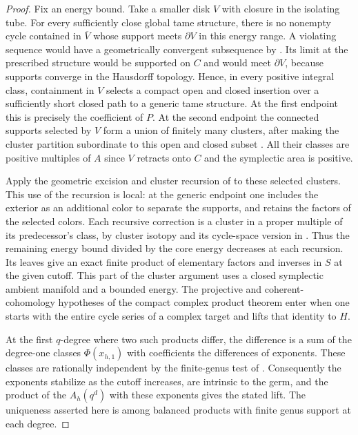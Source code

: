 \begin{proof}
Fix an energy bound. Take a smaller disk $V$ with closure in the
isolating tube. For every sufficiently close global tame structure,
there is no nonempty cycle contained in $\overline V$ whose support
meets $\partial V$ in this energy range. A violating sequence would
have a geometrically convergent subsequence by
\cite[Theorem~2.11]{diw}. Its limit at the prescribed structure
would be supported on $C$ and would meet $\partial V$, because
supports converge in the Hausdorff topology. Hence, in every positive
integral class, containment in $V$ selects a compact open and closed
insertion over a sufficiently short closed path to a generic tame
structure. At the first endpoint this is precisely the coefficient of
$P$. At the second endpoint the connected supports selected by $V$
form a union of finitely many clusters, after making the cluster
partition subordinate to this open and closed subset
\cite[Propositions~3.18--3.21]{diw}. All their classes are positive
multiples of $A$ since $V$ retracts onto $C$ and the symplectic area
is positive.

Apply the geometric excision and cluster recursion of
\cite[\S4]{WueProduct} to these selected clusters. This use of the
recursion is local: at the generic endpoint one includes the exterior
as an additional color to separate the supports, and retains the
factors of the selected colors. Each recursive correction is a
cluster in a proper multiple of its predecessor's class, by cluster
isotopy \cite[Theorem~3.25]{diw} and its cycle-space version in
\cite[\S4]{WueProduct}. Thus the remaining energy bound divided by the
core energy decreases at each recursion. Its leaves give an exact
finite product of elementary factors and inverses in $S$ at the
given cutoff. This part of the cluster argument uses a closed
symplectic ambient manifold and a bounded energy. The projective and
coherent-cohomology hypotheses of the compact complex product theorem
enter when one starts with the entire cycle series of a complex
target and lifts that identity to $H$.

At the first $q$-degree where two such products differ, the difference
is a sum of the degree-one classes $\Phi(x_{h,1})$ with coefficients
the differences of exponents. These classes are rationally independent
by the finite-genus test of \cite[Theorem~5.1]{WueProduct}.
Consequently the exponents stabilize as the cutoff increases,
are intrinsic to the germ, and the product of the $A_h(q^d)$ with
these exponents gives the stated lift. The uniqueness asserted here
is among balanced products with finite genus support at each degree.


\end{proof}
